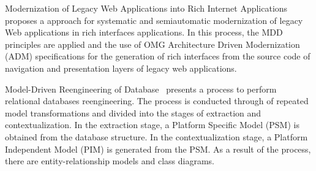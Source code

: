  Modernization of Legacy Web Applications into Rich Internet Applications~\cite{Rodriguez-Echeverria:2011:MLW:2186508.2186536} proposes a approach for systematic and semiautomatic modernization of legacy Web applications in rich interfaces applications. In this process, the MDD principles are applied and the use of OMG Architecture Driven Modernization (ADM) specifications for the generation of rich interfaces from the source code of navigation and presentation layers of legacy web applications. %


Model-Driven Reengineering of Database~\cite{Wang:2009:MRD:1685997.1686596} presents a process to perform relational databases reengineering. The process is conducted through of repeated model transformations and divided into the stages of extraction and contextualization. In the extraction stage, a Platform Specific Model (PSM) is obtained from the database structure. In the contextualization stage, a Platform Independent Model (PIM) is generated from the PSM. As a result of the process, there are entity-relationship models and class diagrams.